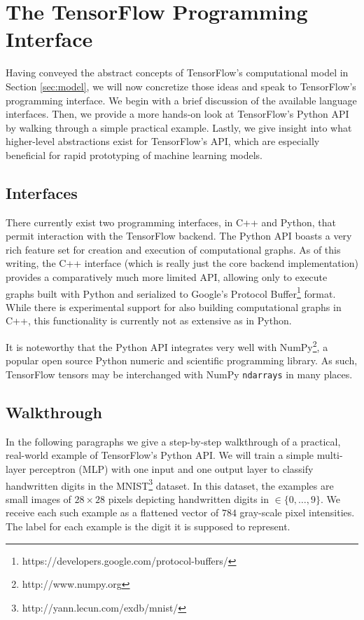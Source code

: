 \section{The TensorFlow Programming Interface}\label{sec:code}

Having conveyed the abstract concepts of TensorFlow's computational model in
Section \ref{sec:model}, we will now concretize those ideas and speak to
TensorFlow's programming interface. We begin with a brief discussion of the
available language interfaces. Then, we provide a more hands-on look at
TensorFlow's Python API by walking through a simple practical example. Lastly,
we give insight into what higher-level abstractions exist for TensorFlow's API,
which are especially beneficial for rapid prototyping of machine learning
models.

\subsection{Interfaces}\label{sec:code-interfaces}

There currently exist two programming interfaces, in C++ and Python, that permit
interaction with the TensorFlow backend. The Python API boasts a very rich
feature set for creation and execution of computational graphs. As of this
writing, the C++ interface (which is really just the core backend
implementation) provides a comparatively much more limited API, allowing only to
execute graphs built with Python and serialized to Google's Protocol
Buffer\footnote{https://developers.google.com/protocol-buffers/} format. While
there is experimental support for also building computational graphs in C++,
this functionality is currently not as extensive as in Python.

It is noteworthy that the Python API integrates very well with
NumPy\footnote{http://www.numpy.org}, a popular open source Python numeric and
scientific programming library. As such, TensorFlow tensors may be interchanged
with NumPy \texttt{ndarrays} in many places.

\subsection{Walkthrough}\label{sec:code-walk}

In the following paragraphs we give a step-by-step walkthrough of a practical,
real-world example of TensorFlow's Python API. We will train a simple
multi-layer perceptron (MLP) with one input and one output layer to classify
handwritten digits in the MNIST\footnote{http://yann.lecun.com/exdb/mnist/}
dataset. In this dataset, the examples are small images of $28 \times 28$ pixels
depicting handwritten digits in $\in \{0, \dots, 9\}$. We receive each such
example as a flattened vector of $784$ gray-scale pixel intensities. The label
for each example is the digit it is supposed to represent.

